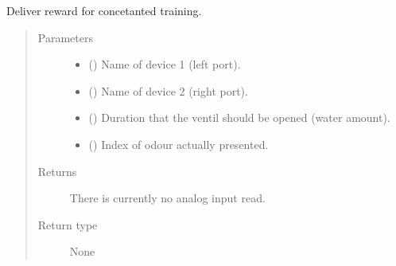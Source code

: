 \documentclass[letterpaper,10pt,english]{sphinxmanual}
\begin{document}
\begin{fulllineitems}
\label{\detokenize{NoSeMazeController/HelperFunctions:HelperFunctions.Reward.deliver_reward_static_concatenate}}
\pysigstartsignatures
{}
\pysigstopsignatures
\sphinxAtStartPar
Deliver reward for concetanted training.
\begin{quote}\begin{description}
\item[{Parameters}] \leavevmode\begin{itemize}
\item {} 
\sphinxAtStartPar
{} () \textendash{} Name of device 1 (left port).

\item {} 
\sphinxAtStartPar
{} () \textendash{} Name of device 2 (right port).

\item {} 
\sphinxAtStartPar
{} () \textendash{} Duration that the ventil should be opened (water amount).

\item {} 
\sphinxAtStartPar
{} () \textendash{} Index of odour actually presented.

\end{itemize}

\item[{Returns}] \leavevmode
\sphinxAtStartPar
{} \textendash{} There is currently no analog input read.

\item[{Return type}] \leavevmode
\sphinxAtStartPar
None

\end{description}\end{quote}

\end{fulllineitems}

\end{document}
